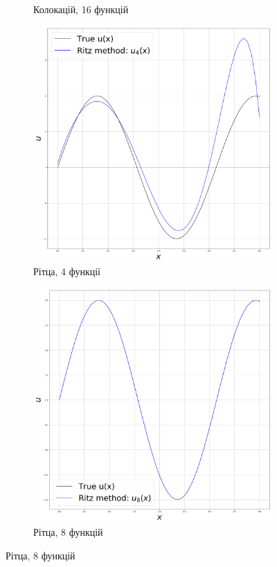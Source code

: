 \begin{figure}[H]
\begin{subfigure}{.5\textwidth}
    \caption{Колокацій, 16 функцій}
    \end{subfigure}
    \hfill
    \begin{subfigure}{.5\textwidth}
    \centering
    \includegraphics[width=.95\linewidth]{ritz_4.png}
    \caption{Рітца, 4 функції}
    \end{subfigure}
    \begin{subfigure}{.5\textwidth}
    \centering
    \includegraphics[width=.95\linewidth]{ritz_8.png}
    \caption{Рітца, 8 функцій}
    \end{subfigure}
\end{figure}


